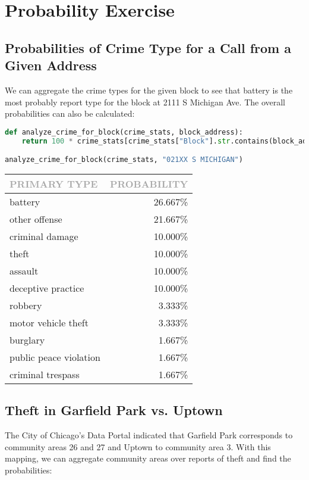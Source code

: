 \documentclass[11pt]{article}
\newcommand{\printsubsection}[1]{\normalfont\headerfontlt\textcolor{darkgray}{{#1}}}
\newcommand{\opns}[1]{\textrm{\small\printsubsection{\MakeUppercase{#1}}}}
\begin{document}
\section{Probability Exercise}
\subsection{Probabilities of Crime Type for a Call from a Given Address}
We can aggregate the crime types for the given block to see that battery is the most probably report type for the block at 2111 S Michigan Ave. The overall probabilities can also be calculated: 

\begin{lstlisting}[language=Python, numbers=none]
def analyze_crime_for_block(crime_stats, block_address):
    return 100 * crime_stats[crime_stats["Block"].str.contains(block_address)]["Primary Type"].value_counts(normalize=True)

analyze_crime_for_block(crime_stats, "021XX S MICHIGAN")
\end{lstlisting}
\begin{table}[H]
\centering \renewcommand{\arraystretch}{1.2}
\begin{tabular}{l|r}
\opns{Primary Type} &  \opns{Probability} \\\hline
battery                &     26.667\% \\
other offense          &     21.667\% \\
criminal damage        &     10.000\% \\
theft                  &     10.000\% \\
assault                &     10.000\% \\
deceptive practice     &     10.000\% \\
robbery                &      3.333\% \\
motor vehicle theft    &      3.333\% \\
burglary               &      1.667\% \\
public peace violation &      1.667\% \\
criminal trespass      &      1.667\% \\
\end{tabular}
\end{table}

\subsection{Theft in Garfield Park vs. Uptown}
The City of Chicago's Data Portal indicated that Garfield Park corresponds to community areas 26 and 27 and Uptown to community area 3. With this mapping, we can aggregate community areas over reports of theft and find the probabilities:
\end{document}
